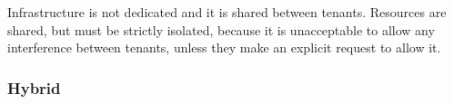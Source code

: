 Infrastructure is not dedicated and it is shared between tenants. Resources are shared, but must be strictly isolated, because it is unacceptable to allow any interference between tenants, unless they make an explicit request to allow it.

\subsubsection{Hybrid}





